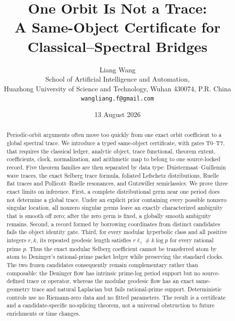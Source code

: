\documentclass[11pt]{article}
\title{\textbf{One Orbit Is Not a Trace:}\\
A Same-Object Certificate for Classical--Spectral Bridges}
\author{Liang Wang\\
\small School of Artificial Intelligence and Automation,\\[-2pt]
\small Huazhong University of Science and Technology, Wuhan 430074, P.R. China\\
\small \texttt{wangliang.f@gmail.com}}
\date{13 August 2026}
\theoremstyle{definition}
\theoremstyle{remark}
\begin{document}
\maketitle

\begin{abstract}
Periodic-orbit arguments often move too quickly from one exact orbit
coefficient to a global spectral trace.  We introduce a typed same-object
certificate, with gates T0--T7, that requires the classical ledger, analytic
object, trace functional, theorem extent, coefficients, clock, normalization,
and arithmetic map to belong to one source-locked record.  Five theorem
families are then separated by data type: Duistermaat--Guillemin wave traces,
the exact Selberg trace formula, foliated Lefschetz distributions, Ruelle flat
traces and Pollicott--Ruelle resonances, and Gutzwiller semiclassics.  We prove
three exact limits on inference.  First, a complete distributional germ near
one period does not determine a global trace.  Under an explicit prior
containing every possible nonzero singular location, all nonzero singular
germs leave an exactly characterized ambiguity that is smooth off zero; after
the zero germ is fixed, a globally smooth ambiguity remains.  Second, a record
formed by borrowing coordinates from distinct candidates fails the object
identity gate.  Third, for every modular hyperbolic class and all positive
integers $r,k$, its repeated geodesic length satisfies
$r\ell_\gamma\ne k\log p$ for every rational prime $p$.  Thus the exact
modular Selberg coefficient cannot be transferred atom by atom to Deninger's
rational-prime packet ledger while preserving the standard clocks.  The two
frozen candidates consequently remain complementary rather than composable:
the Deninger flow has intrinsic prime-log period support but no source-defined
trace or operator, whereas the modular geodesic flow has an exact same-geometry
trace and natural Laplacian but fails rational-prime support.  Deterministic
controls use no Riemann-zero data and no fitted parameters.  The result is a
certificate and a candidate-specific no-splicing theorem, not a universal
obstruction to future enrichments or time changes.
\end{abstract}
\end{document}

